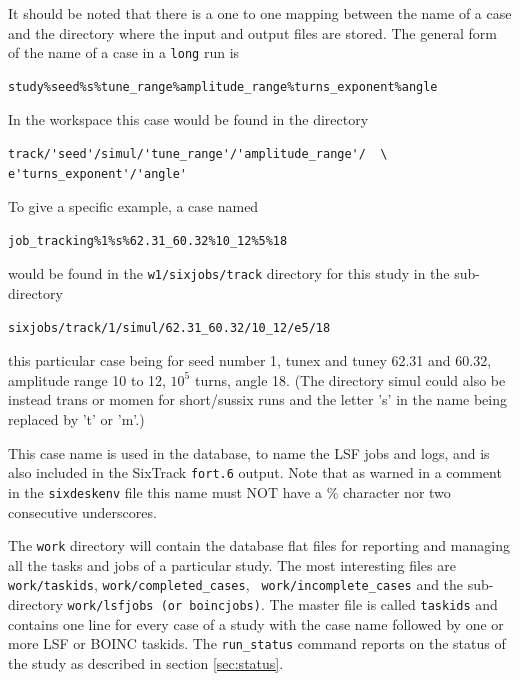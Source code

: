 \documentclass{cernatsnote}
\begin{document}
It should be noted that there is a one to one mapping between the name of a
case and the directory where the input and output files are stored. The general
form of the name of a case in a {\tt long} run is
\begin{verbatim}
study%seed%s%tune_range%amplitude_range%turns_exponent%angle
\end{verbatim}
In the workspace this case would be found in the directory
\begin{verbatim}
track/'seed'/simul/'tune_range'/'amplitude_range'/  \
e'turns_exponent'/'angle'
\end{verbatim}
To give a specific example, a case named
\begin{verbatim}
job_tracking%1%s%62.31_60.32%10_12%5%18
\end{verbatim} would be found in the {\tt w1/sixjobs/track} directory for 
this study in the sub-directory
\begin{verbatim}
sixjobs/track/1/simul/62.31_60.32/10_12/e5/18
\end{verbatim}
this particular case being for seed number 1, tunex and tuney 62.31 and 60.32,
amplitude range 10 to 12, $10^5$ turns, angle 18. (The directory simul could
also be instead trans or momen for short/sussix runs and the letter 's' in the
name being replaced by 't' or 'm'.)

This case name is used in the database, to name the LSF jobs and logs, and is
also included in the SixTrack {\tt fort.6} output. Note that as warned in a
comment in the {\tt sixdeskenv} file this name must NOT have a \% character nor
two consecutive underscores.

The {\tt work} directory will contain the database flat files for reporting and
managing all the tasks and jobs of a particular study.  The most interesting
files are {\tt work/taskids}, {\tt work/completed\_cases}, {\tt
work/incomplete\_cases} and the sub-directory {\tt work/lsfjobs (or
boincjobs)}.  The master file is called {\tt taskids} and contains one line for
every case of a study with the case name followed by one or more LSF or BOINC
taskids. The {\tt run\_status} command reports on the status of the study as
described in section \ref{sec:status}.
\end{document}

